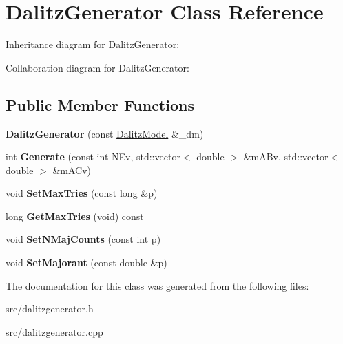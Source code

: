 \hypertarget{class_dalitz_generator}{}\section{Dalitz\+Generator Class Reference}
\label{class_dalitz_generator}


Inheritance diagram for Dalitz\+Generator\+:


Collaboration diagram for Dalitz\+Generator\+:
\subsection*{Public Member Functions}
\begin{DoxyCompactItemize}
\item 
\hypertarget{class_dalitz_generator_a8d9666a9959a77c0c424a18398d769b1}{}{\bfseries Dalitz\+Generator} (const \hyperlink{class_dalitz_model}{Dalitz\+Model} \&\+\_\+dm)\label{class_dalitz_generator_a8d9666a9959a77c0c424a18398d769b1}

\item 
\hypertarget{class_dalitz_generator_a60e315ce4ddc37d4f00edb963863fb00}{}int {\bfseries Generate} (const int N\+Ev, std\+::vector$<$ double $>$ \&m\+A\+Bv, std\+::vector$<$ double $>$ \&m\+A\+Cv)\label{class_dalitz_generator_a60e315ce4ddc37d4f00edb963863fb00}

\item 
\hypertarget{class_dalitz_generator_a9dea7cc9c820f29cdac2ce771fa4003d}{}void {\bfseries Set\+Max\+Tries} (const long \&p)\label{class_dalitz_generator_a9dea7cc9c820f29cdac2ce771fa4003d}

\item 
\hypertarget{class_dalitz_generator_ab37467992c6656042b35e01a9a79d3c5}{}long {\bfseries Get\+Max\+Tries} (void) const \label{class_dalitz_generator_ab37467992c6656042b35e01a9a79d3c5}

\item 
\hypertarget{class_dalitz_generator_af043f50c3190df0eb6f96b55939c15e5}{}void {\bfseries Set\+N\+Maj\+Counts} (const int p)\label{class_dalitz_generator_af043f50c3190df0eb6f96b55939c15e5}

\item 
\hypertarget{class_dalitz_generator_a5b2adc8297bf21803f25ad04862b0221}{}void {\bfseries Set\+Majorant} (const double \&p)\label{class_dalitz_generator_a5b2adc8297bf21803f25ad04862b0221}

\end{DoxyCompactItemize}


The documentation for this class was generated from the following files\+:\begin{DoxyCompactItemize}
\item 
src/dalitzgenerator.\+h\item 
src/dalitzgenerator.\+cpp\end{DoxyCompactItemize}
